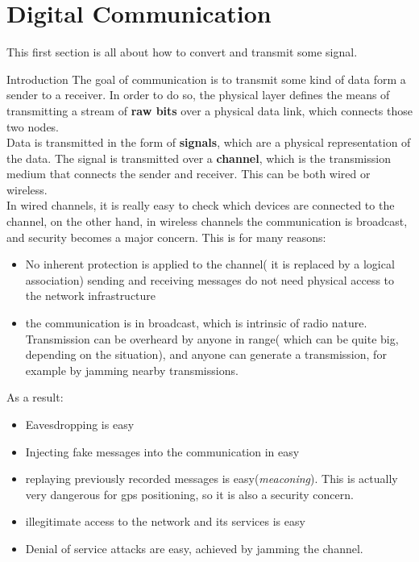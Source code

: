 \chapter{Digital Communication}
This first section is all about how to convert and transmit some signal.
\begin{section}{Introduction}
\label{sec:intro}
The goal of communication is to transmit some kind of data form a sender to a receiver. In order 
to do so, the physical layer defines the means of transmitting a stream of \textbf{raw bits} over a
physical data link, which connects those two nodes.\\
Data is transmitted in the form of \textbf{signals}, which are a physical representation of the data.
The signal is transmitted over a \textbf{channel}, which is the transmission medium that connects 
the sender and receiver. This can be both wired or wireless.\\
In wired channels, it is really easy to check which devices are connected to the channel, on the
other hand, in wireless channels the communication is broadcast, and security becomes a major
concern. This is for many reasons:
\begin{itemize}
  \item No inherent protection is applied to the channel( it is replaced by a logical association)
     \subitem sending and receiving messages do not need physical access to the network 
     infrastructure
  \item the communication is in broadcast, which is intrinsic of radio nature.
    \subitem Transmission can be overheard by anyone in range( which can be quite big, depending 
    on the situation), and anyone can generate a transmission, for example by jamming nearby 
    transmissions.
\end{itemize}
As a result:
\begin{itemize}
  \item Eavesdropping is easy
  \item Injecting fake messages into the communication in easy
  \item replaying previously recorded messages is easy(\textit{meaconing}). This is actually very 
    dangerous for gps positioning, so it is also a security concern.
  \item illegitimate access to the network and its services is easy
  \item Denial of service attacks are easy, achieved by jamming the channel.
\end{itemize}
\end{section}
